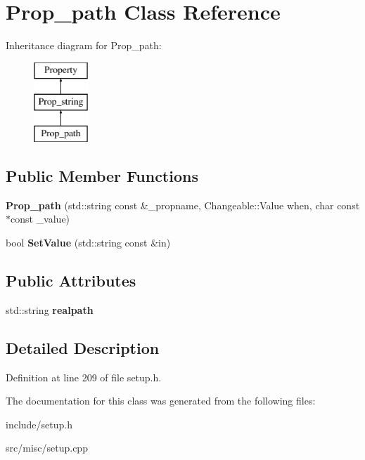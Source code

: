 \hypertarget{classProp__path}{\section{Prop\-\_\-path Class Reference}
\label{classProp__path}
}
Inheritance diagram for Prop\-\_\-path\-:\begin{figure}[H]
\begin{center}
\leavevmode
\includegraphics[height=3.000000cm]{classProp__path}
\end{center}
\end{figure}
\subsection*{Public Member Functions}
\begin{DoxyCompactItemize}
\item 
\hypertarget{classProp__path_a913eabbbfd399fed38f39381946e2eba}{{\bfseries Prop\-\_\-path} (std\-::string const \&\-\_\-propname, Changeable\-::\-Value when, char const $\ast$const \-\_\-value)}\label{classProp__path_a913eabbbfd399fed38f39381946e2eba}

\item 
\hypertarget{classProp__path_a0ba43ea1b4d1be0feb1ee6aa13428ed4}{bool {\bfseries Set\-Value} (std\-::string const \&in)}\label{classProp__path_a0ba43ea1b4d1be0feb1ee6aa13428ed4}

\end{DoxyCompactItemize}
\subsection*{Public Attributes}
\begin{DoxyCompactItemize}
\item 
\hypertarget{classProp__path_aa4281b80a9ba382027add3a82eecd7c3}{std\-::string {\bfseries realpath}}\label{classProp__path_aa4281b80a9ba382027add3a82eecd7c3}

\end{DoxyCompactItemize}


\subsection{Detailed Description}


Definition at line 209 of file setup.\-h.



The documentation for this class was generated from the following files\-:\begin{DoxyCompactItemize}
\item 
include/setup.\-h\item 
src/misc/setup.\-cpp\end{DoxyCompactItemize}
